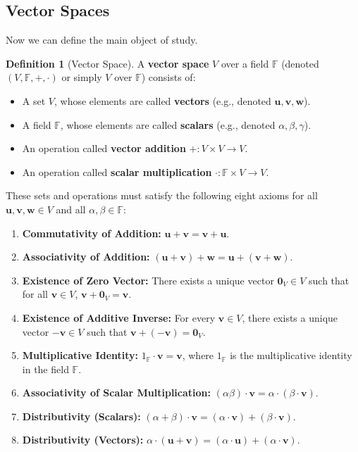 \documentclass[11pt]{article}
\theoremstyle{definition}
\newtheorem{definition}[theorem]{Definition}
\theoremstyle{remark}
\newcommand{\field}[1]{\mathbb{#1}} %
\newcommand{\F}{\field{F}} %
\newcommand{\veca}[1]{\mathbf{#1}} %
\begin{document}
\subsection{Vector Spaces}

Now we can define the main object of study.

\begin{definition}[Vector Space]
A \textbf{vector space} $V$ over a field $\F$ (denoted $(V, \F, +, \cdot)$ or simply $V$ over $\F$) consists of:
\begin{itemize}
    \item A set $V$, whose elements are called \textbf{vectors} (e.g., denoted $\veca{u}, \veca{v}, \veca{w}$).
    \item A field $\F$, whose elements are called \textbf{scalars} (e.g., denoted $\alpha, \beta, \gamma$).
    \item An operation called \textbf{vector addition} $+ : V \times V \to V$.
    \item An operation called \textbf{scalar multiplication} $\cdot : \F \times V \to V$.
\end{itemize}
These sets and operations must satisfy the following eight axioms for all $\veca{u}, \veca{v}, \veca{w} \in V$ and all $\alpha, \beta \in \F$:

\begin{enumerate}
    \item \textbf{Commutativity of Addition:} $\veca{u} + \veca{v} = \veca{v} + \veca{u}$.
    \item \textbf{Associativity of Addition:} $(\veca{u} + \veca{v}) + \veca{w} = \veca{u} + (\veca{v} + \veca{w})$.
    \item \textbf{Existence of Zero Vector:} There exists a unique vector $\veca{0}_V \in V$ such that for all $\veca{v} \in V$, $\veca{v} + \veca{0}_V = \veca{v}$.
    \item \textbf{Existence of Additive Inverse:} For every $\veca{v} \in V$, there exists a unique vector $-\veca{v} \in V$ such that $\veca{v} + (-\veca{v}) = \veca{0}_V$.
    \item \textbf{Multiplicative Identity:} $1_\F \cdot \veca{v} = \veca{v}$, where $1_\F$ is the multiplicative identity in the field $\F$.
    \item \textbf{Associativity of Scalar Multiplication:} $(\alpha \beta) \cdot \veca{v} = \alpha \cdot (\beta \cdot \veca{v})$.
    \item \textbf{Distributivity (Scalars):} $(\alpha + \beta) \cdot \veca{v} = (\alpha \cdot \veca{v}) + (\beta \cdot \veca{v})$.
    \item \textbf{Distributivity (Vectors):} $\alpha \cdot (\veca{u} + \veca{v}) = (\alpha \cdot \veca{u}) + (\alpha \cdot \veca{v})$.
\end{enumerate}
\end{definition}
\end{document}
